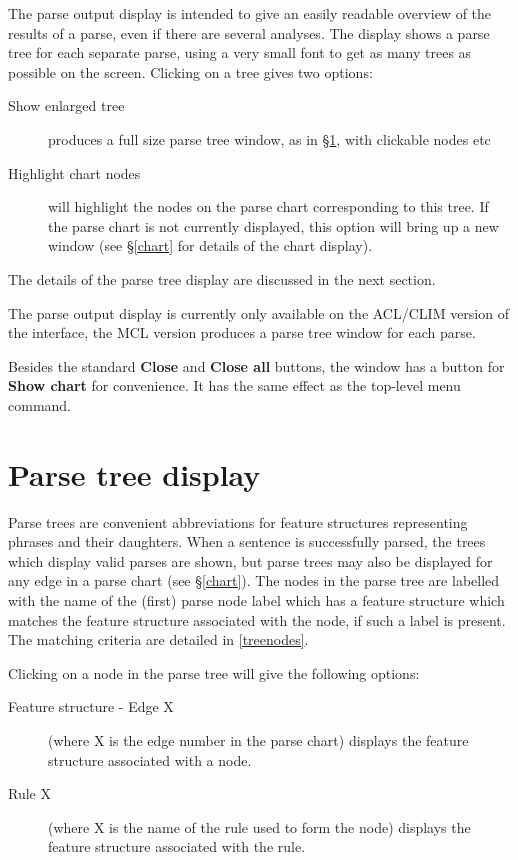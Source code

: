\documentclass[12pt]{report}
\begin{document}
The parse output display is intended to give an easily readable
overview of the results of a parse, even if there are several
analyses.  The display shows a parse tree for each separate
parse, using a very small font to get as many trees as possible on
the screen.  Clicking on a tree gives two options:
\begin{description}
\item[Show enlarged tree] produces a full size parse tree window, as
in \S\ref{parsetree}, with clickable nodes etc
\item[Highlight chart nodes] will highlight the nodes on the 
parse chart corresponding to this tree.  If the parse chart is not currently
displayed, this option will bring up a new window (see \S\ref{chart}
for details of the chart display).
\end{description}
The details of the parse tree display are discussed in the next section.

The parse output display is currently only available on the ACL/CLIM
version of the interface, the MCL version produces a parse tree
window for each parse.

Besides the standard {\bf Close} and {\bf Close all} buttons,
the window has a button for {\bf Show chart} for convenience.
It has the same effect as the top-level menu command.


\section{Parse tree display}
\label{parsetree}

Parse trees are convenient abbreviations for feature structures 
representing phrases and their
daughters.  When a sentence is successfully
parsed, the trees which display valid
parses are shown, but parse trees may also be displayed for any edge in 
a parse chart (see \S\ref{chart}).
The nodes in the parse tree are labelled with the name of the 
(first) parse node label which has a feature structure which matches 
the feature structure associated with the node, if such a label 
is present.  The matching criteria are detailed in \ref{treenodes}.  

Clicking on a node in the parse tree will
give the following options:
\begin{description}
\item [Feature structure - Edge X]  (where X is the edge number in the
parse chart) displays the feature structure associated
with a node.
\item [Rule X] (where X is the name of the
rule used to form the node) 
displays the feature structure associated with the rule.
\end{description}
\end{document}
